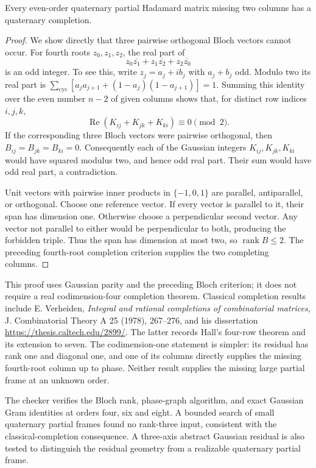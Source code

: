 \begin{theorem}
Every even-order quaternary partial Hadamard matrix missing two
columns has a quaternary completion.
\end{theorem}
\begin{proof}
We show directly that three pairwise orthogonal Bloch vectors cannot
occur. For fourth roots $z_0,z_1,z_2$, the real part of
\[
 z_0\overline{z_1}+z_1\overline{z_2}+z_2\overline{z_0}
\]
is an odd integer. To see this, write $z_j=a_j+ib_j$ with
$a_j+b_j$ odd. Modulo two its real part is
$\sum_{\mathrm{cyc}}[a_ja_{j+1}+(1-a_j)(1-a_{j+1})]=1$.
Summing this identity over the even number $n-2$ of given columns
shows that, for distinct row indices $i,j,k$,
\[
 \operatorname{Re}(K_{ij}+K_{jk}+K_{ki})\equiv0\pmod2.
\]
If the corresponding three Bloch vectors were pairwise orthogonal,
then $B_{ij}=B_{jk}=B_{ki}=0$. Consequently each of the Gaussian
integers $K_{ij},K_{jk},K_{ki}$ would have squared modulus two,
and hence odd real part. Their sum would have odd real part,
a contradiction.

Unit vectors with pairwise inner products in $\{-1,0,1\}$ are
parallel, antiparallel, or orthogonal. Choose one reference vector.
If every vector is parallel to it, their span has dimension one.
Otherwise choose a perpendicular second vector. Any vector not
parallel to either would be perpendicular to both, producing the
forbidden triple. Thus the span has dimension at most two, so
$\operatorname{rank}B\le2$. The preceding fourth-root completion
criterion supplies the two completing columns.
\end{proof}

This proof uses Gaussian parity and the preceding Bloch criterion;
it does not require a real codimension-four completion theorem.
Classical completion results include E. Verheiden,
\emph{Integral and rational completions of combinatorial matrices},
J. Combinatorial Theory A 25 (1978), 267--276, and his dissertation
\url{https://thesis.caltech.edu/2899/}. The latter records Hall's
four-row theorem and its extension to seven.
The codimension-one statement is simpler: its residual has rank one
and diagonal one, and one of its columns directly supplies the
missing fourth-root column up to phase. Neither result supplies
the missing large partial frame at an unknown order.

The checker verifies the Bloch rank, phase-graph algorithm, and exact
Gaussian Gram identities at orders four, six and eight. A bounded
search of small quaternary partial frames found no rank-three input,
consistent with the classical-completion consequence. A three-axis
abstract Gaussian residual is also tested to distinguish the
residual geometry from a realizable quaternary partial frame.
